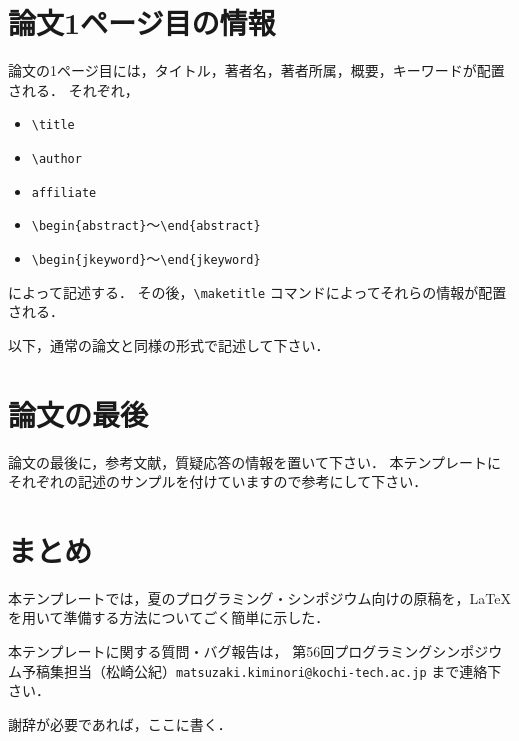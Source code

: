 \documentclass{ipsjprosym}
\begin{document}
\section{論文1ページ目の情報}

論文の1ページ目には，タイトル，著者名，著者所属，概要，キーワードが配置される．
それぞれ，
\begin{itemize}
\item \verb|\title| 
\item \verb|\author|
\item \verb|affiliate|
\item \verb|\begin{abstract}|〜\verb|\end{abstract}|
\item \verb|\begin{jkeyword}|〜\verb|\end{jkeyword}|
\end{itemize}
によって記述する．
その後，\verb|\maketitle| コマンドによってそれらの情報が配置される．

以下，通常の論文と同様の形式で記述して下さい．

\section{論文の最後}

論文の最後に，参考文献，質疑応答の情報を置いて下さい．
本テンプレートにそれぞれの記述のサンプルを付けていますので参考にして下さい．

\section{まとめ}

本テンプレートでは，夏のプログラミング・シンポジウム向けの原稿を，\LaTeX
を用いて準備する方法についてごく簡単に示した．

本テンプレートに関する質問・バグ報告は，
第56回プログラミングシンポジウム予稿集担当（松崎公紀）\verb|matsuzaki.kiminori@kochi-tech.ac.jp|
まで連絡下さい．

\begin{acknowledgment}
謝辞が必要であれば，ここに書く．
\end{acknowledgment}

% 
% 
\end{document}
